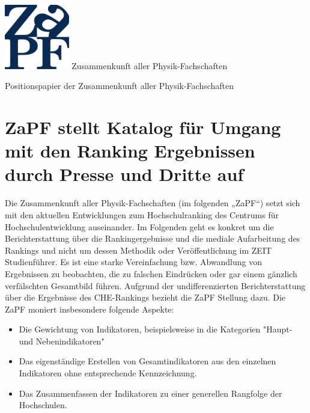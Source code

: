 \documentclass[DIV=calc]{scrartcl}
\begin{document}
    \hspace{0.87\textwidth}
    \begin{minipage}{120pt}
        \vspace{-1.8cm}
        \includegraphics[width=80pt]{logo.pdf}
        \centering
        \small Zusammenkunft aller Physik-Fachschaften
    \end{minipage}
    \begin{center}
        \huge{Positionspapier der Zusammenkunft aller Physik-Fachschaften} \\
        \normalsize
    \end{center}
    
    \vspace{1cm}
    \section*{ZaPF stellt Katalog für Umgang mit den Ranking Ergebnissen durch Presse und Dritte auf}
    
    Die Zusammenkunft aller Physik-Fachschaften (im folgenden „ZaPF“) setzt sich mit den aktuellen Entwicklungen zum Hochschulranking des Centrums für Hochschulentwicklung auseinander. Im Folgenden geht es konkret um die Berichterstattung über die Rankingergebnisse und die mediale Aufarbeitung des Rankings und nicht um dessen Methodik oder Veröffentlichung im ZEIT Studienführer. Es ist eine starke Vereinfachung bzw. Abwandlung von Ergebnissen zu beobachten, die zu falschen Eindrücken oder gar einem gänzlich verfälschten Gesamtbild führen. Aufgrund der undifferenzierten Berichterstattung über die Ergebnisse des CHE-Rankings bezieht die ZaPF Stellung dazu.
    Die ZaPF moniert insbesondere folgende Aspekte:
    
    \begin{itemize}
        \item Die Gewichtung von Indikatoren, beispielsweise in die Kategorien "Haupt- und Nebenindikatoren"
        \item Das eigenständige Erstellen von Gesamtindikatoren aus den einzelnen Indikatoren ohne entsprechende Kennzeichnung.
        \item Das Zusammenfassen der Indikatoren zu einer generellen Rangfolge der Hochschulen.
    \end{itemize}
    
\end{document}

